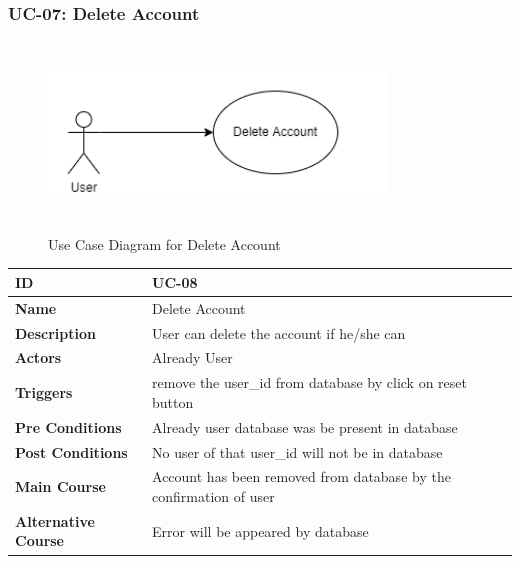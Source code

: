     \subsubsection{UC-07: Delete Account}
    \begin{figure}[H]
        \includegraphics[height=5cm, width=0.8\textwidth]{./diagrams/Use Case/u7.png}
        \centering 
        \caption{Use Case Diagram for Delete Account}
        \label{fig:Usecase1}
        \end{figure}
        
    \begin{center}
        \begin{tabularx}{\textwidth}{|l|X|}
            \hline
            \textbf{ID} & UC-08 \\
            \hline
            \textbf{Name} & Delete Account \\
            \hline
            \textbf{Description} & User can delete the account if he/she can \\
            \hline
            \textbf{Actors} & Already User \\
            \hline
            \textbf{Triggers} & remove the user\_id from database by click on reset button \\
            \hline
            \textbf{Pre Conditions} & Already user database was be present in database \\
            \hline
            \textbf{Post Conditions} & No user of that user\_id will not be in database \\
            \hline
            \textbf{Main Course} & Account has been removed from database by the confirmation of user \\
            \hline
            \textbf{Alternative Course} & Error will be appeared by database \\
            \hline
            
        \end{tabularx}
    \end{center}
    \newpage
    

